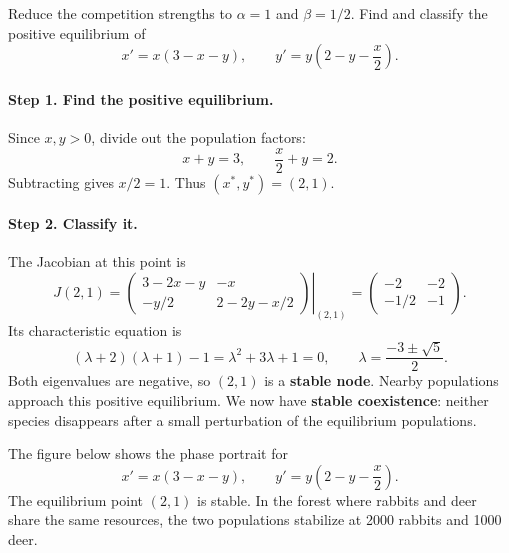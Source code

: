 \documentclass[10pt,letterpaper]{article}
\begin{document}
\begin{example}[3]{
Reduce the competition strengths to $\alpha=1$ and $\beta=1/2$.
Find and classify the positive equilibrium of
\[
x'=x(3-x-y),\qquad y'=y\left(2-y-\frac{x}{2}\right).
\]
}
\paragraph{Step 1. Find the positive equilibrium.}
Since $x,y>0$, divide out the population factors:
\[
x+y=3,\qquad \frac{x}{2}+y=2.
\]
Subtracting gives $x/2=1$. Thus $(x^*,y^*)=(2,1)$.

\paragraph{Step 2. Classify it.}
The Jacobian at this point is
\[
J(2,1)=
\left.\begin{pmatrix}3-2x-y&-x\\-y/2&2-2y-x/2\end{pmatrix}
\right|_{(2,1)}
=\begin{pmatrix}-2&-2\\-1/2&-1\end{pmatrix}.
\]
Its characteristic equation is
\[
(\lambda+2)(\lambda+1)-1=\lambda^2+3\lambda+1=0,
\qquad \lambda=\frac{-3\pm\sqrt5}{2}.
\]
Both eigenvalues are negative, so $(2,1)$ is a \textbf{stable node}.
Nearby populations approach this positive equilibrium. We now have
\textbf{stable coexistence}: neither species disappears after a small
perturbation of the equilibrium populations.
\end{example}

The figure below shows the phase portrait for 
\[
x'=x(3-x-y),\qquad y'=y\left(2-y-\frac{x}{2}\right).
\]
The equilibrium point $(2,1)$ is stable. In the forest where rabbits and deer share the same resources, the two populations stabilize at 2000 rabbits and 1000 deer.
\end{document}
